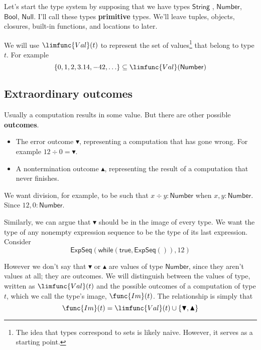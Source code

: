 \documentclass[12pt]{article}
\begin{document}
Let's start the type system by supposing that we have types $\mathsf{String}$%
, $\mathsf{Number}$, $\mathsf{Bool}$, $\mathsf{Null}$. I'll call these types 
\textbf{primitive} types. We'll leave tuples, objects, closures, built-in
functions, and locations to later.

We will use $\limfunc{Val}(t)$ to represent the set of values\footnote{%
The idea that types correspond to sets is likely naive. However, it serves
as a starting point.} that belong to type $t$. For example%
\begin{equation*}
\left\{ 0,1,2,3.14,-42,\ldots \right\} \subseteq \limfunc{Val}(\mathsf{Number%
})
\end{equation*}

\subsection{Extraordinary outcomes}

Usually a computation results in some value. But there are other possible 
\textbf{outcomes}.

\begin{itemize}
\item The error outcome $\blacktriangledown $, representing a computation
that has gone wrong. For example $12\div 0=\blacktriangledown $.

\item A nontermination outcome $\blacktriangle $, representing the result of
a computation that never finishes.
\end{itemize}

We want division, for example, to be such that $x\div y:\mathsf{Number}$
when $x,y:\mathsf{Number}$. Since $12,0:\mathsf{Number}$.

Similarly, we can argue that $\blacktriangledown $ should be in the image of
every type. We want the type of any nonempty expression sequence to be the
type of its last expression. Consider%
\begin{equation*}
\mathsf{ExpSeq}\mathrm{(\mathsf{while}(\mathsf{true},\mathsf{ExpSeq}()),12)}
\end{equation*}

However we don't say that $\blacktriangledown $ or $\blacktriangle $ are
values of type $\mathsf{Number}$, since they aren't values at all; they are
outcomes. We will distinguish between the values of type, written as $%
\limfunc{Val}(t)$ and the possible outcomes of a computation of type $t$,
which we call the type's image, $\func{Im}(t)$. The relationship is simply
that%
\begin{equation*}
\func{Im}(t)=\limfunc{Val}(t)\cup \left\{ \blacktriangledown ,\blacktriangle
\right\}
\end{equation*}
\end{document}
